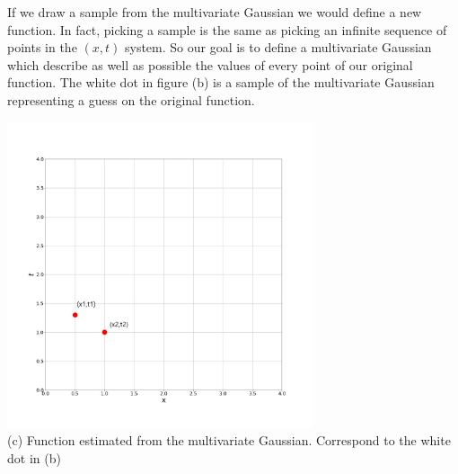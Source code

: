 \documentclass[../main.tex]{subfiles}
\begin{document}
If we draw a sample from the multivariate Gaussian we would define a new function. In fact, picking a sample is the same as picking an infinite sequence of points in the $(x,t)$ system. So our goal is to define a multivariate Gaussian which describe as well as possible the values of every point of our original function. The white dot in figure (b) is a sample of the multivariate Gaussian representing a guess on the original function.
\begin{center}
    \includegraphics[width=90mm]{images/SampleGaussianProcesses.jpg} \\
    (c) Function estimated from the multivariate Gaussian. Correspond to the white dot in (b)
\end{center}
\end{document}
